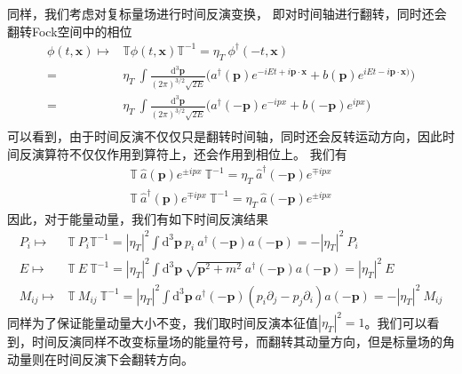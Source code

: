 同样，我们考虑对复标量场进行时间反演变换，
即对时间轴进行翻转，同时还会翻转Fock空间中的相位
\begin{equation}
\begin{split}
        \phi(t,\boldsymbol{x}) \mapsto& \mathbb{T}\phi(t,\boldsymbol{x})\mathbb{T}^{-1} =  \eta_T~\phi^\dagger(-t,\boldsymbol{x})\\
        =& \eta_T~\int\frac{\mathrm{d}^3\boldsymbol{p}}{(2\pi)^{3/2}\sqrt{2E}}\Big( a^\dagger(\boldsymbol{p})e^{-iEt+i\boldsymbol{p\cdot\boldsymbol{x}}} + b(\boldsymbol{p})e^{iEt-i\boldsymbol{p\cdot\boldsymbol{x}})}\Big) \\
        =& \eta_T~\int\frac{\mathrm{d}^3\boldsymbol{p}}{(2\pi)^{3/2}\sqrt{2E}}\Big( a^\dagger(-\boldsymbol{p})e^{-ipx} + b(-\boldsymbol{p})e^{ipx}\Big) \\
\end{split}
\end{equation}
可以看到，由于时间反演不仅仅只是翻转时间轴，同时还会反转运动方向，因此时间反演算符不仅仅作用到算符上，还会作用到相位上。
我们有
\begin{align}
    \mathbb{T}~ \hat{a}(\boldsymbol{p})e^{\pm i px} ~\mathbb{T}^{-1} = \eta_T~\hat{a}^\dagger(\boldsymbol{-p})e^{\mp i px}\\
    \mathbb{T}~ \hat{a}^\dagger(\boldsymbol{p})e^{\mp i px} ~\mathbb{T}^{-1} = \eta_T~\hat{a}(\boldsymbol{-p})e^{\pm i px}
\end{align}
因此，对于能量动量，我们有如下时间反演结果
\begin{align}
    P_i \mapsto& \mathbb{T}~P_i \mathbb{T}^{-1} = |\eta_T|^2\int\mathrm{d}^3\boldsymbol{p}~ p_i~ a^\dagger(-\boldsymbol{p})a(-\boldsymbol{p}) = -|\eta_T|^2~P_i\\
    E \mapsto& \mathbb{T}~E~ \mathbb{T}^{-1} = |\eta_T|^2\int\mathrm{d}^3\boldsymbol{p}~ \sqrt{\boldsymbol{p}^2+m^2}~ a^\dagger(-\boldsymbol{p})a(-\boldsymbol{p}) = |\eta_T|^2~E\\
     M_{ij} \mapsto& \mathbb{T}~M_{ij}~ \mathbb{T}^{-1} = |\eta_T|^2\int\mathrm{d}^3\boldsymbol{p}~  a^\dagger(-\boldsymbol{p}) (p_i\partial_j  - p_j\partial_i ) a(-\boldsymbol{p}) = -|\eta_T|^2~M_{ij}
\end{align}
同样为了保证能量动量大小不变，我们取时间反演本征值$|\eta_T|^2=1$。我们可以看到，时间反演同样不改变标量场的能量符号，而翻转其动量方向，但是标量场的角动量则在时间反演下会翻转方向。


